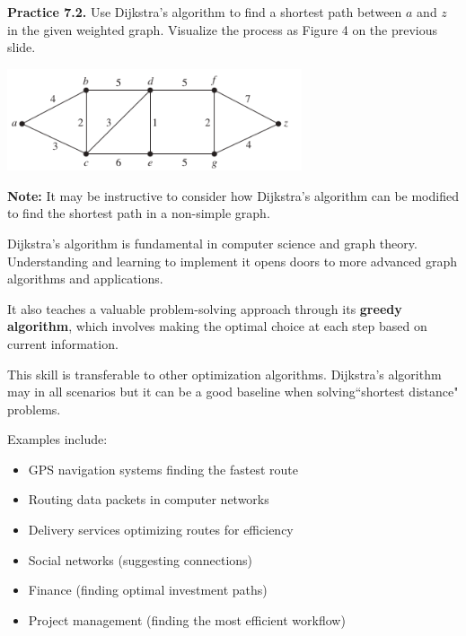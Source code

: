 \documentclass[aspectratio=169]{beamer}
\begin{document}
\begin{frame}[plain]{}

{\bf Practice 7.2.} Use Dijkstra's algorithm to find a shortest path 
between $a$ and $z$ in the given weighted graph. Visualize the process as
Figure 4 on the previous slide.

 \begin{center}
     \includegraphics[height=3cm]{./img/lecture7-fig4.png}
  \end{center}
 
 \vspace{1in}
 
 {\bf Note:} It may be instructive to consider how Dijkstra's algorithm can be modified 
to find the shortest path in a non-simple graph.

\end{frame}

\begin{frame}[plain]{}
 
 Dijkstra's algorithm is fundamental in computer science and graph theory. 
 Understanding and learning to implement it opens doors to more advanced graph algorithms 
 and applications. %
 \medskip
 
 It also teaches a valuable problem-solving approach through 
 its {\bf greedy algorithm}, which involves making the optimal choice at each step based 
 on current information.
 \medskip
 
This skill is transferable to other optimization algorithms. 
Dijkstra’s algorithm may  in all scenarios 
but it can be a good baseline when solving``shortest distance" problems.
 \medskip
 
Examples include:
\begin{itemize}
  \item GPS navigation systems finding the fastest route
  \item Routing data packets in computer networks
  \item Delivery services optimizing routes for efficiency
  \item Social networks (suggesting connections)
  \item Finance (finding optimal investment paths)
  \item Project management (finding the most efficient workflow)
\end{itemize}

\end{frame}
\end{document}
